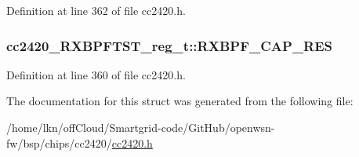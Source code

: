 Definition at line 362 of file cc2420.\+h.

\subsubsection[{\texorpdfstring{R\+X\+B\+P\+F\+\_\+\+C\+A\+P\+\_\+\+R\+ES}{RXBPF_CAP_RES}}]{ cc2420\+\_\+\+R\+X\+B\+P\+F\+T\+S\+T\+\_\+reg\+\_\+t\+::\+R\+X\+B\+P\+F\+\_\+\+C\+A\+P\+\_\+\+R\+ES}\hypertarget{structcc2420___r_x_b_p_f_t_s_t__reg__t_a1a18e0b036874ec52b0a8921e05c4a84}{}\label{structcc2420___r_x_b_p_f_t_s_t__reg__t_a1a18e0b036874ec52b0a8921e05c4a84}


Definition at line 360 of file cc2420.\+h.



The documentation for this struct was generated from the following file\+:\begin{DoxyCompactItemize}
\item 
/home/lkn/off\+Cloud/\+Smartgrid-\/code/\+Git\+Hub/openwsn-\/fw/bsp/chips/cc2420/\hyperlink{cc2420_8h}{cc2420.\+h}\end{DoxyCompactItemize}
